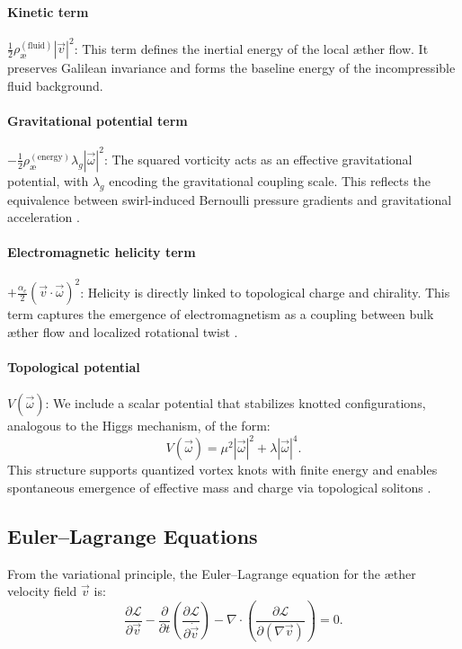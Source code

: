 \paragraph{Kinetic term}
$\frac{1}{2} \rho_\text{\ae}^{(\text{fluid})} |\vec{v}|^2$:
This term defines the inertial energy of the local \ae{}ther flow. It preserves Galilean invariance and forms the baseline energy of the incompressible fluid background.

\paragraph{Gravitational potential term}
$-\frac{1}{2} \rho_\text{\ae}^{(\text{energy})} \lambda_g |\vec{\omega}|^2$:
The squared vorticity acts as an effective gravitational potential, with $\lambda_g$ encoding the gravitational coupling scale. This reflects the equivalence between swirl-induced Bernoulli pressure gradients and gravitational acceleration \cite{helmholtz1858integrals,batchelor2000introduction}.

\paragraph{Electromagnetic helicity term}
$+\frac{\alpha_e}{2} (\vec{v} \cdot \vec{\omega})^2$:
Helicity is directly linked to topological charge and chirality. This term captures the emergence of electromagnetism as a coupling between bulk æther flow and localized rotational twist \cite{moffatt1969degree,kato1990topological}.

\paragraph{Topological potential}
$V(\vec{\omega})$:
We include a scalar potential that stabilizes knotted configurations, analogous to the Higgs mechanism, of the form:
\begin{equation}
V(\vec{\omega}) = \mu^2 |\vec{\omega}|^2 + \lambda |\vec{\omega}|^4.
\end{equation}
This structure supports quantized vortex knots with finite energy and enables spontaneous emergence of effective mass and charge via topological solitons \cite{ranada1990topological,arrayas2017knots}.

\subsection{Euler--Lagrange Equations}

From the variational principle, the Euler--Lagrange equation for the \ae{}ther velocity field $\vec{v}$ is:
\begin{equation}
\frac{\partial \mathcal{L}}{\partial \vec{v}}
- \frac{\partial}{\partial t} \left( \frac{\partial \mathcal{L}}{\partial \dot{\vec{v}}} \right)
- \nabla \cdot \left( \frac{\partial \mathcal{L}}{\partial (\nabla \vec{v})} \right) = 0.
\end{equation}

